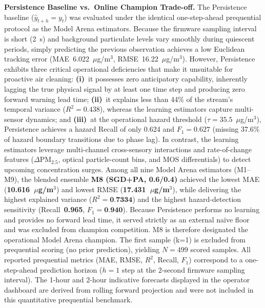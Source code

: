 \documentclass[12pt,a4paper]{article}
\newcommand{\ugsm}{$\mu$g/m$^3$}
\begin{document}
\textbf{Persistence Baseline vs.\ Online Champion Trade-off.}
The Persistence baseline ($\hat{y}_{t+h}=y_t$) was evaluated under the identical one-step-ahead prequential
protocol as the Model Arena estimators. Because the firmware sampling interval is short (2~s) and background
particulate levels vary smoothly during quiescent periods, simply predicting the previous observation achieves
a low Euclidean tracking error (MAE~6.022~\ugsm, RMSE~16.22~\ugsm). However, Persistence exhibits three critical
operational deficiencies that make it unsuitable for proactive air cleaning:
\textbf{(i)}~it possesses zero anticipatory capability, inherently lagging the true physical signal by at least one
time step and producing zero forward warning lead time;
\textbf{(ii)}~it explains less than 44\% of the stream's temporal variance ($R^2=0.438$), whereas the learning
estimators capture multi-sensor dynamics; and
\textbf{(iii)}~at the operational hazard threshold ($\tau=35.5$~\ugsm), Persistence achieves a hazard Recall of
only 0.624 and $F_1=0.627$ (missing 37.6\% of hazard boundary transitions due to phase lag).
In contrast, the learning estimators leverage multi-channel cross-sensory interactions and rate-of-change features
($\Delta\text{PM}_{2.5}$, optical particle-count bins, and MOS differentials) to detect upcoming concentration surges.
Among all nine Model Arena estimators (M1--M9), the blended ensemble \textbf{M8 (SGD+PA, 0.6/0.4)} achieved the lowest
MAE (\textbf{10.616~\ugsm}) and lowest RMSE (\textbf{17.431~\ugsm}), while delivering the highest explained variance
($R^2=\textbf{0.7334}$) and the highest hazard-detection sensitivity (Recall~\textbf{0.965}, $F_1=\textbf{0.940}$).
Because Persistence performs no learning and provides no forward lead time, it served strictly as an external na\"ive floor
and was excluded from champion competition. M8 is therefore designated the operational Model Arena champion.
The first sample (k=1) is excluded from prequential scoring (no prior prediction),
yielding $N=499$ scored samples. All reported prequential metrics (MAE, RMSE, $R^2$,
Recall, $F_1$) correspond to a one-step-ahead prediction horizon ($h=1$ step at the
2-second firmware sampling interval). The 1-hour and 2-hour indicative forecasts
displayed in the operator dashboard are derived from rolling forward projection and
were not included in this quantitative prequential benchmark.
\end{document}
